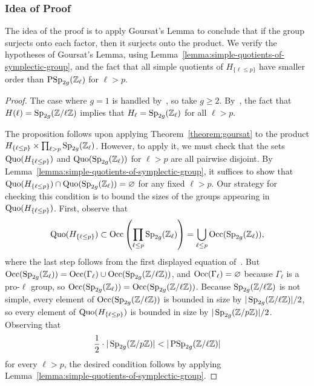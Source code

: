 \subsubsection*{Idea of Proof}
The idea of the proof is to apply Goursat's Lemma to conclude that if the group surjects onto each factor,
then it surjects onto the product.
We verify the hypotheses of Goursat's Lemma,
using Lemma~\ref{lemma:simple-quotients-of-symplectic-group}, and the fact that all simple quotients of $H_{\{\ell \leq p\}}$
have smaller order than $\operatorname{PSp}_{2g}(\mathbb Z_\ell)$ for $\ell > p$.
	\begin{proof}
		The case where $g = 1$ is handled by~\cite[Lemma 7.6]{zywina2010hilbert}, so take $g \geq 2$. By~\cite[Theorem 1]{landesman-swaminathan-tao-xu:lifting-symplectic-group}, the fact that $H(\ell) = \operatorname{Sp}_{2g}(\mathbb Z/ \ell \mathbb Z)$ implies that $H_\ell = \operatorname{Sp}_{2g}(\mathbb Z_\ell)$ for all $\ell > p$.

  The proposition follows upon applying Theorem~\ref{theorem:goursat} to the product $H_{\{\ell \le p\}} \times \prod_{\ell > p} \operatorname{Sp}_{2g}(\mathbb Z_\ell)$. However, to apply it, we must check that the sets $\operatorname{Quo}(H_{\{\ell \le p\}})$ and $\operatorname{Quo}(\operatorname{Sp}_{2g}(\mathbb Z_\ell))$ for $\ell > p$ are all pairwise disjoint. By Lemma~\ref{lemma:simple-quotients-of-symplectic-group}, it suffices to show that $\operatorname{Quo}(H_{\{\ell \le p\}}) \cap \operatorname{Quo}(\operatorname{Sp}_{2g}(\mathbb Z_\ell)) = \varnothing$ for any fixed $\ell > p$. Our strategy for checking this condition is to bound the sizes of the groups appearing in $\operatorname{Quo}(H_{\{\ell \le p\}})$. First, observe that
		\[
			\operatorname{Quo}(H_{\{\ell \le p\}}) \subset \operatorname{Occ}\left( \prod_{\ell \le p} \operatorname{Sp}_{2g}({\mathbb Z}_\ell)\right) = \bigcup_{\ell \le p} \operatorname{Occ}(\operatorname{Sp}_{2g}({\mathbb Z}_\ell)),
		\]
		where the last step follows from the first displayed equation of~\cite[p.\ IV-25]{serre1989abelian}.
But
\(
			\operatorname{Occ}(\operatorname{Sp}_{2g}({\mathbb Z}_\ell)) = \operatorname{Occ}(\Gamma_\ell) \cup \operatorname{Occ}(\operatorname{Sp}_{2g}({\mathbb Z} / \ell \mathbb Z))
		\),
and $\operatorname{Occ}(\Gamma_\ell) = \varnothing$ because $\Gamma_\ell$ is a pro-$\ell$ group, so
		\(
			\operatorname{Occ}(\operatorname{Sp}_{2g}({\mathbb Z}_\ell)) = \operatorname{Occ}(\operatorname{Sp}_{2g}({\mathbb Z} / \ell \mathbb Z))
		\).
		Because $\operatorname{Sp}_{2g}({\mathbb Z} / \ell \mathbb Z)$ is not simple, every element of $\operatorname{Occ}(\operatorname{Sp}_{2g}({\mathbb Z} / \ell \mathbb Z))$ is bounded in size by $|\operatorname{Sp}_{2g}({\mathbb Z} / \ell \mathbb Z)| / 2$, so every element of $\operatorname{Quo}(H_{\{\ell \le p\}})$ is bounded in size by $|\operatorname{Sp}_{2g}({\mathbb Z} / p \mathbb Z)| / 2$. Observing that
		\[
			\frac{1}{2} \cdot |\operatorname{Sp}_{2g}({\mathbb Z} / p {\mathbb Z})| < |\operatorname{PSp}_{2g}({\mathbb Z} / \ell {\mathbb Z})|
		\]
		for every $\ell > p$, the desired condition follows by applying Lemma~\ref{lemma:simple-quotients-of-symplectic-group}.
	\end{proof}

